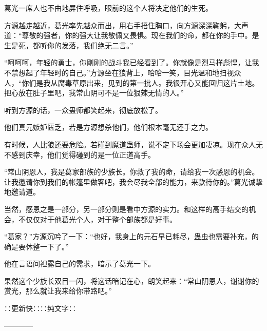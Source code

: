 \begin{this_body}
葛光一席人也不由地屏住呼吸，眼前的这个人将决定他们的生死。

方源越走越近，葛光率先越众而出，用右手捂住胸口，向方源深深鞠躬，大声道：“尊敬的强者，你的强大让我敬佩又畏惧。现在我们的命，都在你的手中。是生是死，都听你的发落，我们绝无二言。”

“呵呵呵，年轻的勇士，你刚刚的战斗我已经看到了。你就像是烈马样彪悍，让我不禁想起了年轻时的自己。”方源坐在狼背上，哈哈一笑，目光温和地扫视众人，“你们是我从腐毒草原出来，见到的第一批人。我很开心又能回归这片土地。把心放在肚子里吧，我常山阴可不是一位狠辣无情的人。”

听到方源的话，一众蛊师都笑起来，彻底放松了。

他们真元嫉妒匮乏，若是方源想杀他们，他们根本毫无还手之力。

有时候，人比狼还要危险。若碰到魔道蛊师，说不定下场会更加凄凉。现在众人无不感到庆幸，他们觉得碰到的是一位正道高手。

“常山阴恩人，我是葛家部族的少族长。你救了我的命，请给我一次感恩的机会。让我邀请你到我们的帐篷里做客吧，我会尽我全部的能力，来款待你的。”葛光诚挚地邀请道。

当然，感恩之是一部分，另一部分则是看中方源的实力。和这样的高手结交的机会，不仅仅对于他葛光个人，对于整个部族都是好事。

“葛家？”方源沉吟了一下：“也好，我身上的元石早已耗尽，蛊虫也需要补充，的确是要休整一下了。”

他在言语间袒露自己的需求，暗示了葛光一下。

果然这个少族长双目一闪，将这话暗记在心，朗笑起来：“常山阴恩人，谢谢你的赏光，那么就让我来给你带路吧。”

∷更新快∷∷纯文字∷

------------

\end{this_body}

